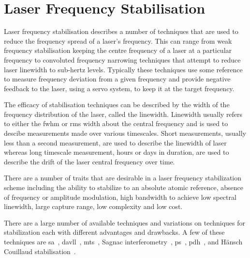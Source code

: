 \section{Laser Frequency Stabilisation}

Laser frequency stabilisation describes a number of techniques that are used to reduce the frequency spread of a laser's frequency.
This can range from weak frequency stabilisation keeping the centre frequency of a laser at a particular frequency to convoluted frequency narrowing techniques that attempt to reduce laser linewidth to sub-hertz levels.
Typically these techniques use some reference to measure frequency deviation from a given frequency and provide negative feedback to the laser, using a servo system, to keep it at the target frequency.

The efficacy of stabilisation techniques can be described by the width of the frequency distribution of the laser, called the linewidth.
Linewidth usually refers to either the \gls{fwhm} or \gls{rms} width about the central frequency and is used to descibe measurements made over various timescales.
Short measurements, usually less than a second measurement, are used to describe the linewidth of laser whereas long timescale measurement, hours or days in duration, are used to describe the drift of the laser central frequency over time.

There are a number of traits that are desirable in a laser frequency stabilization scheme including the ability to stabilize to an absolute atomic reference, absence of frequency or amplitude modulation, high bandwidth to achieve low spectral linewidth, large capture range, low complexity and low cost.

There are a large number of available techniques and variations on techniques for stabilization each with different advantages and drawbacks.
A few of these techniques are \gls{sa}~\cite{haroche_theory_1972, maguire_theoretical_2006, cuneo_optically_1994, preston_doppler-free_1996, saliba_linewidths_2009}, \gls{davll}~\cite{corwin_frequency-stabilized_1998, millett-sikking_davll_2007}, \gls{mts}~\cite{shirley_modulation_1982, mccarron_modulation_2008, xiang-hui_ultra-stable_2009,negnevitsky_wideband_2013}, Sagnac interferometry~\cite{robins_Interferometric_2002, jundt_non-linear_2003}, \acrfull{ps}~\cite{wieman_doppler-free_1976, lancaster_polarisation_1999, yoshikawa_frequency_2003, harris_polarization_2006, pearman_polarization_2002, tiwari_laser_2006, do_polarization_2008, torii_laser-phase_2012}, \gls{pdh}~\cite{drever_laser_1983}, and H\"ansch Couillaud stabilisation~\cite{hansch_laser_1980}.

